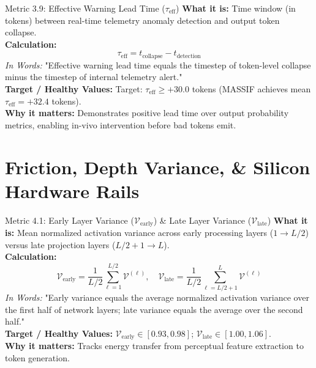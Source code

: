 \documentclass[10pt,a4paper]{article}
\begin{document}
\begin{metricbox}{Metric 3.9: Effective Warning Lead Time ($\tau_{\text{eff}}$)}
\textbf{What it is:} Time window (in tokens) between real-time telemetry anomaly detection and output token collapse.\\
\textbf{Calculation:}
$$\tau_{\text{eff}} = t_{\text{collapse}} - t_{\text{detection}}$$
\emph{In Words:} "Effective warning lead time equals the timestep of token-level collapse minus the timestep of internal telemetry alert."\\
\textbf{Target / Healthy Values:} Target: $\tau_{\text{eff}} \ge +30.0$ tokens (MASSIF achieves mean $\tau_{\text{eff}} = +32.4$ tokens).\\
\textbf{Why it matters:} Demonstrates positive lead time over output probability metrics, enabling in-vivo intervention before bad tokens emit.
\end{metricbox}

\section{Friction, Depth Variance, \& Silicon Hardware Rails}

\begin{metricbox}{Metric 4.1: Early Layer Variance ($\mathcal{V}_{\text{early}}$) \& Late Layer Variance ($\mathcal{V}_{\text{late}}$)}
\textbf{What it is:} Mean normalized activation variance across early processing layers ($1 \to L/2$) versus late projection layers ($L/2+1 \to L$).\\
\textbf{Calculation:}
$$\mathcal{V}_{\text{early}} = \frac{1}{L/2} \sum_{\ell=1}^{L/2} \mathcal{V}^{(\ell)}, \quad \mathcal{V}_{\text{late}} = \frac{1}{L/2} \sum_{\ell=L/2+1}^L \mathcal{V}^{(\ell)}$$
\emph{In Words:} "Early variance equals the average normalized activation variance over the first half of network layers; late variance equals the average over the second half."\\
\textbf{Target / Healthy Values:} $\mathcal{V}_{\text{early}} \in [0.93, 0.98]$; $\mathcal{V}_{\text{late}} \in [1.00, 1.06]$.\\
\textbf{Why it matters:} Tracks energy transfer from perceptual feature extraction to token generation.
\end{metricbox}
\end{document}
